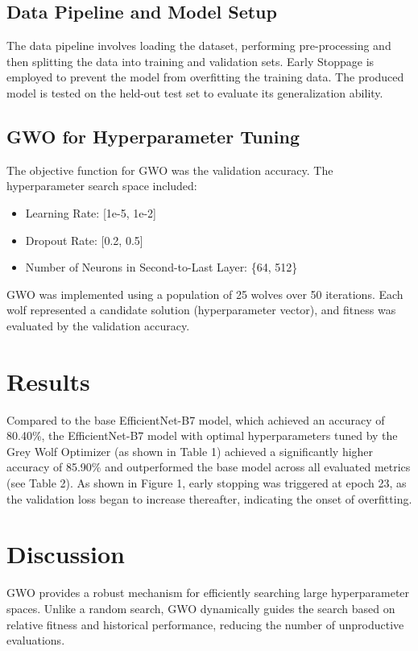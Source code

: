 \documentclass[conference]{IEEEtran}
\begin{document}
\subsection{Data Pipeline and Model Setup}
The data pipeline involves loading the dataset, performing pre-processing and then splitting the data into training and validation sets. Early Stoppage is employed to prevent the model from overfitting the training data. The produced model is tested on the held-out test set to evaluate its generalization ability.


\subsection{GWO for Hyperparameter Tuning}
The objective function for GWO was the validation accuracy. The hyperparameter search space included:

\begin{itemize}
    \item Learning Rate: [1e-5, 1e-2]
    \item Dropout Rate: [0.2, 0.5]
    \item Number of Neurons in Second-to-Last Layer: \{64, 512\}
\end{itemize}

GWO was implemented using a population of 25 wolves over 50 iterations. Each wolf represented a candidate solution (hyperparameter vector), and fitness was evaluated by the validation accuracy.

\section{Results}
Compared to the base EfficientNet-B7 model, which achieved an accuracy of 80.40\%, the EfficientNet-B7 model with optimal hyperparameters tuned by the Grey Wolf Optimizer (as shown in Table 1) achieved a significantly higher accuracy of 85.90\% and outperformed the base model across all evaluated metrics (see Table 2). As shown in Figure 1, early stopping was triggered at epoch 23, as the validation loss began to increase thereafter, indicating the onset of overfitting.




\section{Discussion}
GWO provides a robust mechanism for efficiently searching large hyperparameter spaces. Unlike a random search, GWO dynamically guides the search based on relative fitness and historical performance, reducing the number of unproductive evaluations.
\end{document}
